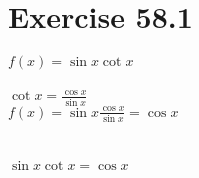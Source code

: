 \documentclass[a4paper, 10pt]{scrartcl}
\begin{document}
\section{Exercise 58.1}

$f(x) = \sin{x} \cot{x}$\\
\\
$\cot{x} = \frac{\cos{x}}{\sin{x}}$
\\
$f(x) = \sin{x} \frac{\cos{x}}{\sin{x}} = \cos{x}$\\
\\
\\
$\sin{x} \cot{x} = \cos{x}$
\end{document}
